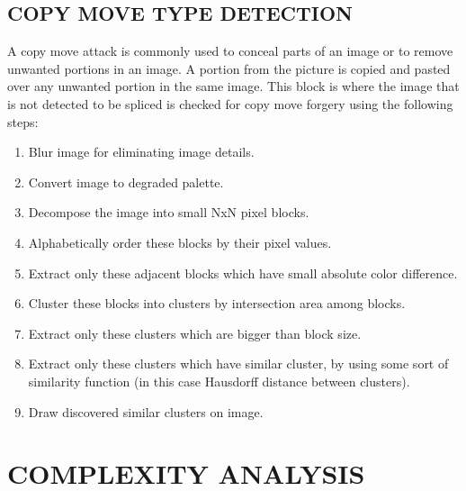 \subsection{COPY MOVE TYPE DETECTION}
A copy move attack is commonly used to conceal parts of an image or to remove unwanted portions in an image. A portion from the picture is copied and pasted over any unwanted portion in the same image.
This block is where the image that is not detected to be spliced is checked for copy move forgery using the following steps:
\begin{enumerate}
    \item Blur image for eliminating image details.
    
\item Convert image to degraded palette.

\item Decompose the image into small NxN pixel blocks.

\item Alphabetically order these blocks by their pixel values.

\item Extract only these adjacent blocks which have small absolute color difference.

\item Cluster these blocks into clusters by intersection area among blocks.

\item Extract only these clusters which are bigger than block size.

\item Extract only these clusters which have similar cluster, by using some sort of similarity function (in this case Hausdorff distance between clusters).

\item Draw discovered similar clusters on image.

\end{enumerate}


\section{COMPLEXITY ANALYSIS}
